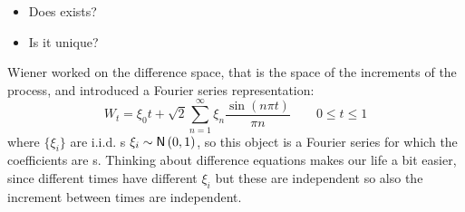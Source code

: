 \documentclass{report}
\begin{document}
\begin{itemize}
	\item Does \bwm{} exists?
	\item Is it unique?
\end{itemize}
Wiener worked on the difference space, that is the space of the increments of the process, and introduced a Fourier series representation:
\begin{equation*}
	W_t=\xi_{0}t+\sqrt{2}\sum_{n=1}^{\infty}\xi_{n}\frac{\sin(n\pi t)}{\pi n}\qquad0\leq t\leq 1
\end{equation*}
where $\{\xi_{i}\}$ are i.i.d. \rv s $\xi_{i}\sim\mathsf{N}\left(0,1\right)$, so this object is a Fourier series for which the coefficients are \rv s. Thinking about difference equations makes our life a bit easier, since different times have different $\xi_{i}$ but these are independent so also the increment between times are independent.
\end{document}

